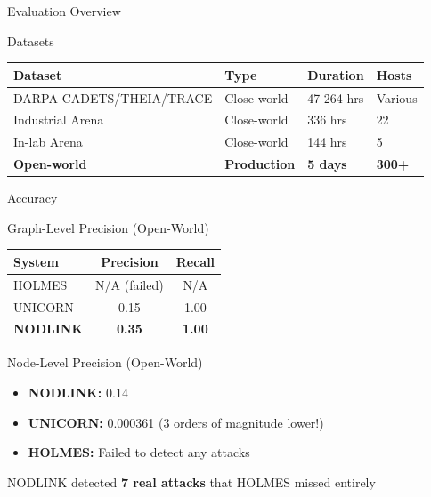 \documentclass[11pt, aspectratio=169]{beamer}
\begin{document}
\begin{frame}{Evaluation Overview}
    \begin{block}{Datasets}
        \begin{table}
        \centering
        \begin{tabular}{llll}
            \toprule
            \textbf{Dataset} & \textbf{Type} & \textbf{Duration} & \textbf{Hosts} \\
            \midrule
            DARPA CADETS/THEIA/TRACE & Close-world & 47-264 hrs & Various \\
            Industrial Arena & Close-world & 336 hrs & 22 \\
            In-lab Arena & Close-world & 144 hrs & 5 \\
            \textbf{Open-world} & \textbf{Production} & \textbf{5 days} & \textbf{300+} \\
            \bottomrule
        \end{tabular}
        \end{table}
    \end{block}
\end{frame}

\begin{frame}{Accuracy}
    \begin{block}{Graph-Level Precision (Open-World)}
        \begin{table}
        \centering
        \begin{tabular}{lcc}
            \toprule
            \textbf{System} & \textbf{Precision} & \textbf{Recall} \\
            \midrule
            HOLMES & N/A (failed) & N/A \\
            UNICORN & 0.15 & 1.00 \\
            \textbf{NODLINK} & \textbf{0.35} & \textbf{1.00} \\
            \bottomrule
        \end{tabular}
        \end{table}
    \end{block}
    \begin{block}{Node-Level Precision (Open-World)}
        \begin{itemize}
            \item \textbf{NODLINK:} 0.14
            \item \textbf{UNICORN:} 0.000361 (3 orders of magnitude lower!)
            \item \textbf{HOLMES:} Failed to detect any attacks
        \end{itemize}
    \end{block}
    \begin{alertblock}{NODLINK detected \textbf{7 real attacks} that HOLMES missed entirely}
    \end{alertblock}
\end{frame}
\end{document}
